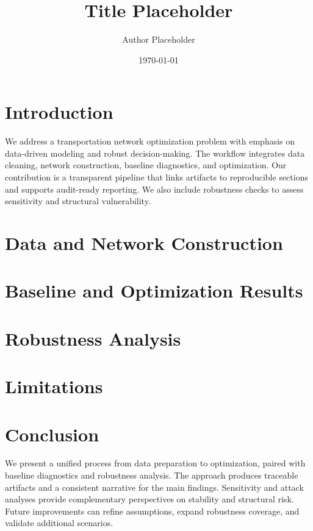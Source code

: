 \documentclass{article}
\title{Title Placeholder}
\author{Author Placeholder}
\date{\today}
\begin{document}
\maketitle

\section{Introduction}
We address a transportation network optimization problem with emphasis on data-driven modeling and robust decision-making. The workflow integrates data cleaning, network construction, baseline diagnostics, and optimization. Our contribution is a transparent pipeline that links artifacts to reproducible sections and supports audit-ready reporting. We also include robustness checks to assess sensitivity and structural vulnerability.

\section{Data and Network Construction}
\FloatBarrier

\section{Baseline and Optimization Results}
\FloatBarrier

\section{Robustness Analysis}
\FloatBarrier

\section{Limitations}
\FloatBarrier

\section{Conclusion}
We present a unified process from data preparation to optimization, paired with baseline diagnostics and robustness analysis. The approach produces traceable artifacts and a consistent narrative for the main findings. Sensitivity and attack analyses provide complementary perspectives on stability and structural risk. Future improvements can refine assumptions, expand robustness coverage, and validate additional scenarios.



\end{document}
